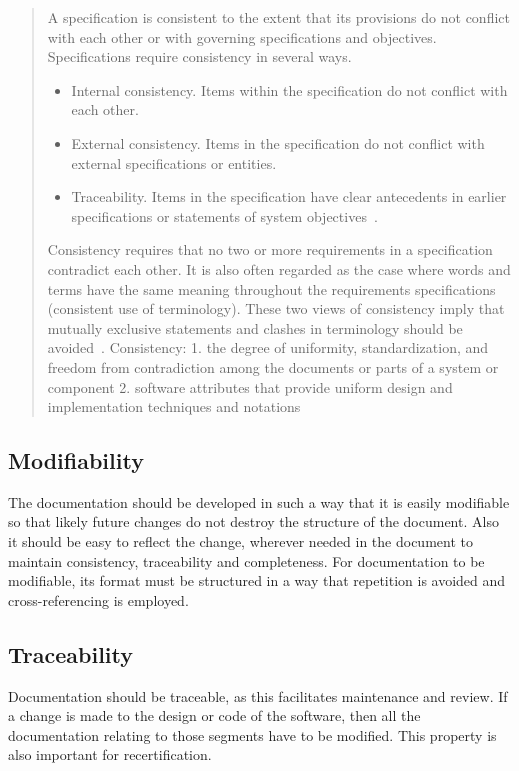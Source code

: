 \documentclass[12pt]{article}
\begin{document}
\begin{quotation}
    A specification is consistent to the extent that its provisions do not conflict with each other or with governing specifications and objectives. Specifications require consistency in several ways.
    \begin{itemize}
        \item Internal consistency. Items within the specification do not conflict with each other.
        \item External consistency. Items in the specification do not conflict with external specifications or entities.
        \item Traceability. Items in the specification have clear antecedents in earlier specifications or statements of system objectives~\cite{Boehm1984}.
    \end{itemize}
    Consistency requires that no two or more requirements in a specification contradict each other. It is also often regarded as the case where words and terms have the same meaning throughout the requirements specifications (consistent use of terminology). These two views of consistency imply that mutually exclusive statements and clashes in terminology should be avoided~\cite{ZOWGHI2003}. Consistency: 1. the degree of uniformity, standardization, and freedom from contradiction among the documents or parts of a system or component 2. software attributes that provide uniform design and implementation techniques and notations~\cite{ISO/IEC/IEEE24765}
\end{quotation}

\subsection{Modifiability}

The documentation should be developed in such a way that it is easily modifiable
so that likely future changes do not destroy the structure of the document. Also
it should be easy to reflect the change, wherever needed in the document to
maintain consistency, traceability and completeness. For documentation to be
modifiable, its format must be structured in a way that repetition is avoided
and cross-referencing is employed.

\subsection{Traceability}

Documentation should be traceable, as this facilitates maintenance and
review. If a change is made to the design or code of the software, then all the
documentation relating to those segments have to be modified.  This property is
also important for recertification.
\end{document}
